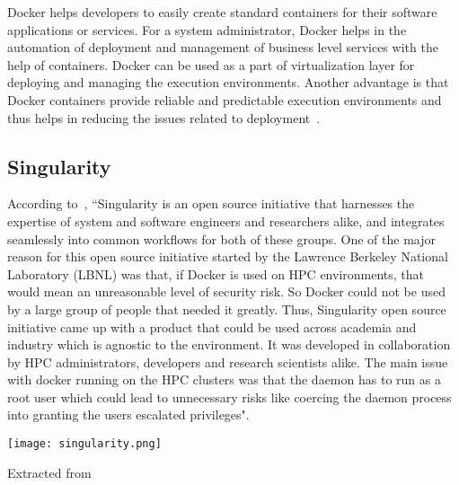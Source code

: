 Docker helps developers to easily create standard containers for their software applications or services. For a system administrator, Docker helps in the automation of deployment and management of business level services with the help of containers. Docker can be used as a part of virtualization layer for deploying and managing the execution environments. Another advantage is that Docker containers provide reliable and predictable execution environments and thus helps in reducing the issues related to deployment~\cite{DBLP:journals/corr/MorrisVHM17}.

\subsection{Singularity}
According to~\cite{10.1371/journal.pone.0177459}, ``Singularity is an open source initiative that harnesses the expertise of system and software engineers and researchers alike, and integrates seamlessly into common workflows for both of these groups. One of the major reason for this open source initiative started by the Lawrence Berkeley National Laboratory (LBNL) was that, if Docker is used on HPC environments, that would mean an unreasonable level of security risk. So Docker could not be used by a large group of people that needed it greatly. Thus, Singularity open source initiative came up with a product that could be used across academia and industry which is agnostic to the environment. It was developed in collaboration by HPC administrators, developers and research scientists alike. The main issue with docker running on the HPC clusters was that the daemon has to run as a root user which could lead to unnecessary risks like coercing the daemon process into granting the users escalated privileges".

\begin{center}
\texttt{[image: singularity.png]}
\label{fig:singularity_workflow}
\caption*{Extracted from \cite{10.1371/journal.pone.0177459}}
\end{center}

